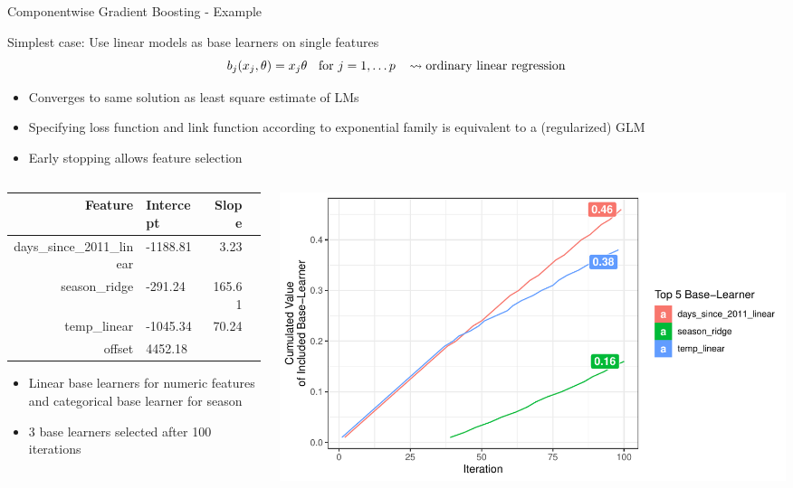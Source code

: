 \documentclass[11pt,compress,t,notes=noshow, aspectratio=169, xcolor=table]{beamer}
\begin{document}
\begin{frame}{Componentwise Gradient Boosting - Example}

Simplest case: Use linear models as base learners on single features
$$
b_j(x_j, \theta) = x_j\theta \hspace*{0.2cm}\text{ for } j = 1,\ldots p \hspace*{0.3cm} \leadsto \text{ordinary linear regression}
$$

\begin{itemize}
\item Converges to same solution as least square estimate of LMs
\item Specifying loss function and link function according to exponential family 
is equivalent to a (regularized) GLM
\item Early stopping allows feature selection

\end{itemize}
\pause
\begin{columns}[T]
\begin{column}{0.4\textwidth}
\scriptsize
  \begin{table}[ht]
\centering
\begin{tabular}{rlrr}
  \hline
 Feature & Intercept & Slope \\ 
  \hline
days\_since\_2011\_linear & -1188.81 & 3.23 \\ 
 season\_ridge & -291.24 & 165.61 \\ 
 temp\_linear & -1045.34 & 70.24 \\ 
 offset & 4452.18 &  \\ 
   \hline
\end{tabular}
\end{table}
\begin{itemize}
    \item Linear base learners for numeric features and categorical base learner for season
    \item 3 base learners selected after 100 iterations
\end{itemize}
\end{column}
\begin{column}{0.55\textwidth}
  \includegraphics[width = .95 \textwidth]{figure/compboost_base_linear.pdf} 
\end{column}
\end{columns}
\end{frame}
\end{document}
